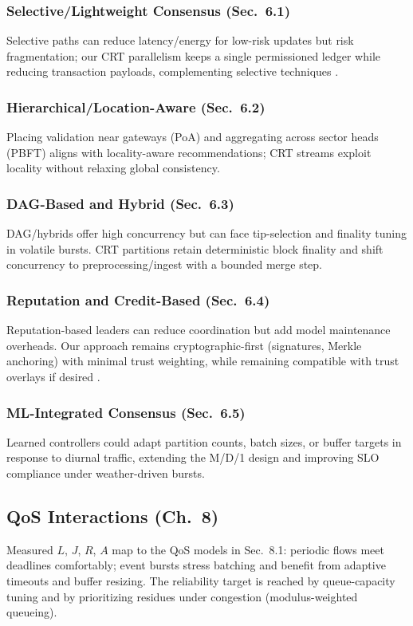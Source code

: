 \subsubsection{Selective/Lightweight Consensus (Sec.~6.1)}
Selective paths can reduce latency/energy for low-risk updates but risk fragmentation; our CRT parallelism keeps a single permissioned ledger while reducing transaction payloads, complementing selective techniques \cite{ali2022blockchainenabledarchitecture}.

\subsubsection{Hierarchical/Location-Aware (Sec.~6.2)}
Placing validation near gateways (PoA) and aggregating across sector heads (PBFT) aligns with locality-aware recommendations; CRT streams exploit locality without relaxing global consistency.

\subsubsection{DAG-Based and Hybrid (Sec.~6.3)}
DAG/hybrids offer high concurrency but can face tip-selection and finality tuning in volatile bursts. CRT partitions retain deterministic block finality and shift concurrency to preprocessing/ingest with a bounded merge step.

\subsubsection{Reputation and Credit-Based (Sec.~6.4)}
Reputation-based leaders can reduce coordination but add model maintenance overheads. Our approach remains cryptographic-first (signatures, Merkle anchoring) with minimal trust weighting, while remaining compatible with trust overlays if desired \cite{morais2023surveyonintegration}.

\subsubsection{ML-Integrated Consensus (Sec.~6.5)}
Learned controllers could adapt partition counts, batch sizes, or buffer targets in response to diurnal traffic, extending the M/D/1 design and improving SLO compliance under weather-driven bursts. %

\subsection{QoS Interactions (Ch.~8)}
Measured $L$, $J$, $R$, $A$ map to the QoS models in Sec.~8.1: periodic flows meet deadlines comfortably; event bursts stress batching and benefit from adaptive timeouts and buffer resizing. The reliability target is reached by queue-capacity tuning and by prioritizing residues under congestion (modulus-weighted queueing).

